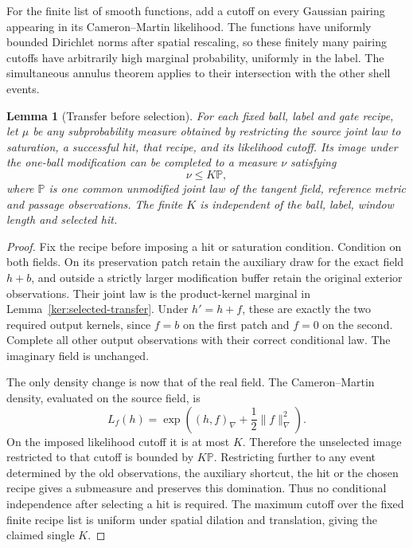 \documentclass[11pt]{article}
\numberwithin{equation}{section}
\newtheorem{lemma}[theorem]{Lemma}
\theoremstyle{definition}
\theoremstyle{remark}
\newcommand{\PP}{\mathbb P}
\newcommand{\1}{\mathbf 1}
\begin{document}
For the finite list of smooth functions, add a cutoff on every
Gaussian pairing appearing in its Cameron--Martin likelihood.  The
functions have uniformly bounded Dirichlet norms after spatial
rescaling, so these finitely many pairing cutoffs have arbitrarily
high marginal probability, uniformly in the label.  The simultaneous
annulus theorem applies to their intersection with the other shell
events.

\begin{lemma}[Transfer before selection]
\label{met:transfer-dominance}
For each fixed ball, label and gate recipe, let $\mu$ be any
subprobability measure obtained by restricting the source joint law
to saturation, a successful hit, that recipe, and its likelihood
cutoff.  Its image under the one-ball modification can be completed
to a measure $\nu$ satisfying
\begin{equation}
 \nu\leq K\PP,
 \label{met:domination}
\end{equation}
where $\PP$ is one common unmodified joint law of the tangent field,
reference metric and passage observations.  The finite $K$ is
independent of the ball, label, window length and selected hit.
\end{lemma}

\begin{proof}
Fix the recipe before imposing a hit or saturation condition.
Condition on both fields.  On its preservation patch retain the
auxiliary draw for the exact field $h+b$, and outside a strictly
larger modification buffer retain the original exterior observations.
Their joint law is the product-kernel marginal in
Lemma~\ref{ker:selected-transfer}.  Under $h'=h+f$, these are
exactly the two required output kernels, since $f=b$ on the first
patch and $f=0$ on the second.  Complete all other output observations
with their correct conditional law.  The imaginary field is unchanged.

The only density change is now that of the real field.  The
Cameron--Martin density, evaluated on the source field, is
\[
 L_f(h)=\exp\left((h,f)_\nabla+\frac12\|f\|_\nabla^2\right).
\]
On the imposed likelihood cutoff it is at most $K$.  Therefore the
unselected image restricted to that cutoff is bounded by $K\PP$.
Restricting further to any event determined by the old observations,
the auxiliary shortcut, the hit or the chosen recipe gives a
submeasure and preserves this domination.  Thus no conditional
independence after selecting a hit is required.  The maximum cutoff
over the fixed finite recipe list is uniform under spatial dilation
and translation, giving the claimed single $K$.
\end{proof}
\end{document}
